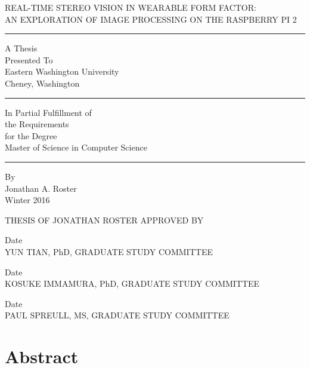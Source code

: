 \documentclass[12]{report}
\begin{document}
\doublespace
\thispagestyle{empty}
\begin{center}
	REAL-TIME STEREO VISION IN WEARABLE FORM FACTOR:\\ AN EXPLORATION OF IMAGE PROCESSING ON THE RASPBERRY PI 2
\end{center}
\hrule
\begin{center}
	A Thesis\\
	Presented To\\
	Eastern Washington University\\
	Cheney, Washington\\
\end{center}
\hrule
\begin{center}
	In Partial Fulfillment of \\
	the Requirements\\
	for the Degree \\
	Master of Science in Computer Science\\
\end{center}
	\hrule
\begin{center}
	By \\
	Jonathan A. Roster\\
	Winter 2016
\end{center}

\newpage
\vspace{.75in}
\begin{center}
THESIS OF JONATHAN ROSTER APPROVED BY
\end{center}
\vspace{1.5in}
\begin{center}
\makebox[3in]{\hrulefill}Date\makebox[1.0in]{\hrulefill}\\
YUN TIAN, PhD, GRADUATE STUDY COMMITTEE

\vspace{.75in}

\makebox[3in]{\hrulefill}Date\makebox[1.0in]{\hrulefill}\\
KOSUKE IMMAMURA, PhD, GRADUATE STUDY COMMITTEE

\vspace{.75in}

\makebox[3in]{\hrulefill}Date\makebox[1.0in]{\hrulefill}\\
PAUL SPREULL, MS, GRADUATE STUDY COMMITTEE
\end{center}

\singlespace
{}
\tableofcontents
\listoffigures
\listoftables
{}

\chapter{Abstract}

\end{document}
